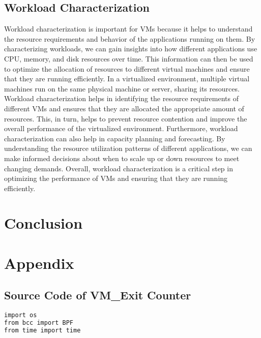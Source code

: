 \documentclass{report}
\begin{document}
\begin{spacing}{1.5}
\section{Workload Characterization}


{\large
Workload characterization is important for VMs because it helps to understand the resource requirements and behavior of the applications running on them. By characterizing workloads, we can gain insights into how different applications use CPU, memory, and disk resources over time. This information can then be used to optimize the allocation of resources to different virtual machines and ensure that they are running efficiently. In a virtualized environment, multiple virtual machines run on the same physical machine or server, sharing its resources. Workload characterization helps in identifying the resource requirements of different VMs and ensures that they are allocated the appropriate amount of resources. This, in turn, helps to prevent resource contention and improve the overall performance of the virtualized environment. Furthermore, workload characterization can also help in capacity planning and forecasting. By understanding the resource utilization patterns of different applications, we can make informed decisions about when to scale up or down resources to meet changing demands. Overall, workload characterization is a critical step in optimizing the performance of VMs and ensuring that they are running efficiently.
\newline
}


\chapter{Conclusion}

{\large


}




\chapter{Appendix}

\section{Source Code of VM\_Exit Counter}


\begin{lstlisting}[caption={Source Code of VM-EXIT Counter},captionpos=b,language=c,firstnumber=1]
import os
from bcc import BPF
from time import time


\end{lstlisting}
\end{spacing}
\end{document}
